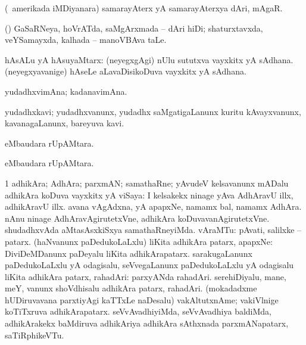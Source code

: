 {\bentry
{} 
\gl{\nA}
\expl{}
\bmng
(\kanu\ amerikada iMDiyanara) samarayAterx yA samarayAterxya dAri, mAgaR. 
\emng

\noindent 
\gl{\pagu}
\expl{}
\bmng
{} (\rUpa) GaSaRNeya, hoVrATda, saMgArxmada -- dAri hiDi; shaturxtavxda, veYSamayxda, kalhada -- manoVBAva taLe. 
\emng
\eentry

\bentry
{} 
\gl{\nA}
\expl{}
\bmng
hAsALu yA hAsuyaMtarx: 
\banum
{} (neyegxgAgi) nUlu sututxva vayxkitx yA sAdhana. 
 (neyegxyavanige) hAseLe aLavaDisikoDuva vayxkitx yA sAdhana. 
\eanum
\emng
\eentry

\bentry
{} 
\gl{\nA}
\expl{}
\bmng
yudadhxvimAna; kadanavimAna. 
\emng
\eentry

\bentry
{} 
\gl{\nA}
\expl{}
\bmng
yudadhxkavi; yudadhxvanunx, yudadhx saMgatigaLanunx kuritu kAvayxvanunx, kavanagaLanunx, bareyuva kavi. 
\emng
\eentry

\bentry
{} 
\gl{\nA}
\expl{}
\bmng
{} eMbaudara rUpAMtara. 
\emng
\eentry

\bentry
{} 
\gl{\gu}
\expl{}
\bmng
{ eMbaudara rUpAMtara.} 
\emng
\eentry

\bentry
{} 
\gl{\nA}
\expl{}
\bmng
\bnum
\num{1} adhikAra; AdhAra; parxmAN; samathaRne; yAvudeV kelsavanunx mADalu adhikAra koDuva vayxkitx yA viSaya:  I kelsakekx ninage yAva AdhAravU illx, adhikAravU illx.  avana vAgAdxna, yA apapxNe, namamx bal, namamx AdhAra.  nAnu ninage AdhAravAgirutetxVne, adhikAra koDuvavanAgirutetxVne.  shudadhxvAda aMtasAsxkiSxya samathaRneyiMda. 
 vAraMTu: 
\banum
{} pAvati, salilxke -- patarx. 
 (haNvanunx paDedukoLaLxlu) liKita adhikAra patarx, apapxNe:  DiviDeMDanunx paDeyalu liKita adhikArapatarx. 
 sarakugaLanunx paDedukoLaLxlu yA odagisalu, seVvegaLanunx paDedukoLaLxlu yA odagisalu liKita adhikAra patarx, rahadAri:  parxyANda rahadAri. 
 serehiDiyalu, mane, meY, \mo vanunx shoVdhisalu adhikAra patarx, rahadAri. 
 (mokadadxme hUDiruvavana parxtiyAgi kaTTxLe naDesalu) vakAltutxnAme; vakiVlnige koTiTxruva adhikArapatarx. 
 seVvAvadhiyiMda, seVvAvadhiya baldiMda, adhikArakekx baMdiruva adhikAriya adhikAra sAthxnada parxmANapatarx, saTiRphikeVTu. 
\eanum
\numie
\enum
\emng
\eentry

}
